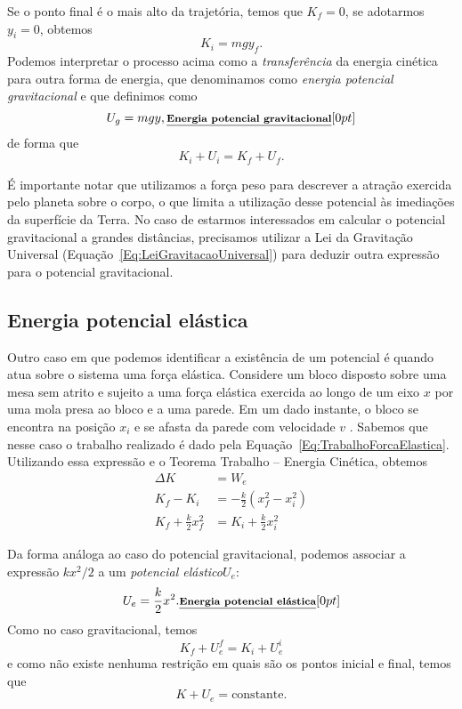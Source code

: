 Se o ponto final é o mais alto da trajetória, temos que $K_f = 0$, se adotarmos $y_i = 0$, obtemos
\begin{equation}
  K_i = mgy_f.
\end{equation}
%
Podemos interpretar o processo acima como a \emph{transferência} da energia cinética para outra forma de energia, que denominamos como \emph{energia potencial gravitacional} e que definimos como
\begin{equation}
  U_g = mgy, \relax{\footnotesize\emph{\textbf{Energia potencial gravitacional}}}[0pt]
\end{equation}
%
de forma que
\begin{equation}
  K_i + U_i = K_f + U_f.
\end{equation}

É importante notar que utilizamos a força peso para descrever a atração exercida pelo planeta sobre o corpo, o que limita a utilização desse potencial às imediações da superfície da Terra. No caso de estarmos interessados em calcular o potencial gravitacional a grandes distâncias, precisamos utilizar a Lei da Gravitação Universal (Equação~\eqref{Eq:LeiGravitacaoUniversal}) para deduzir outra expressão para o potencial gravitacional.

\subsection{Energia potencial elástica}

Outro caso em que podemos identificar a existência de um potencial é quando atua sobre o sistema uma força elástica. Considere um bloco disposto sobre uma mesa sem atrito e sujeito a uma força elástica exercida ao longo de um eixo $x$ por uma mola presa ao bloco e a uma parede. Em um dado instante, o bloco se encontra na posição $x_i$ e se afasta da parede com velocidade $v$ . Sabemos que nesse caso o trabalho realizado é dado pela Equação~\eqref{Eq:TrabalhoForcaElastica}. Utilizando essa expressão e o Teorema Trabalho -- Energia Cinética, obtemos
\begin{align}
  \Delta K &= W_e \\
  K_f - K_i &= -\frac{k}{2}(x_f^2 - x_i^2) \\
  K_f + \frac{k}{2} x_f^2 &= K_i + \frac{k}{2}x_i^2
\end{align}

Da forma análoga ao caso do potencial gravitacional, podemos associar a expressão $kx^2/2$ a um \emph{potencial elástico}$U_e$:
\begin{equation}
  U_e = \frac{k}{2}x^2. \relax{\footnotesize\emph{\textbf{Energia potencial elástica}}}[0pt]
\end{equation}
%
Como no caso gravitacional, temos
\begin{equation}
  K_f + U_e^f = K_i + U_e^i
\end{equation}
%
e como não existe nenhuma restrição em quais são os pontos inicial e final, temos que
\begin{equation}
  K + U_e = \textrm{constante}.
\end{equation}


